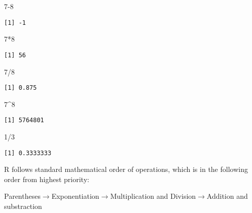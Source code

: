 \documentclass[
  letterpaper,
  DIV=11,
  numbers=noendperiod]{scrartcl}
\newenvironment{Shaded}{\begin{snugshade}}{\end{snugshade}}
\newcommand{\DecValTok}[1]{\textcolor[rgb]{0.68,0.00,0.00}{#1}}
\newcommand{\SpecialCharTok}[1]{\textcolor[rgb]{0.37,0.37,0.37}{#1}}
\begin{document}
\begin{Shaded}
\begin{Highlighting}[]
\DecValTok{7{-}8}
\end{Highlighting}
\end{Shaded}

\begin{verbatim}
[1] -1
\end{verbatim}

\begin{Shaded}
\begin{Highlighting}[]
\DecValTok{7}\SpecialCharTok{*}\DecValTok{8}
\end{Highlighting}
\end{Shaded}

\begin{verbatim}
[1] 56
\end{verbatim}

\begin{Shaded}
\begin{Highlighting}[]
\DecValTok{7}\SpecialCharTok{/}\DecValTok{8}
\end{Highlighting}
\end{Shaded}

\begin{verbatim}
[1] 0.875
\end{verbatim}

\begin{Shaded}
\begin{Highlighting}[]
\DecValTok{7}\SpecialCharTok{\^{}}\DecValTok{8}
\end{Highlighting}
\end{Shaded}

\begin{verbatim}
[1] 5764801
\end{verbatim}

\begin{Shaded}
\begin{Highlighting}[]
\DecValTok{1}\SpecialCharTok{/}\DecValTok{3}
\end{Highlighting}
\end{Shaded}

\begin{verbatim}
[1] 0.3333333
\end{verbatim}

R follows standard mathematical order of operations, which is in the
following order from highest priority:

Parentheses\(\rightarrow\)Exponentiation\(\rightarrow\)Multiplication
and Division\(\rightarrow\)Addition and substraction
\end{document}
